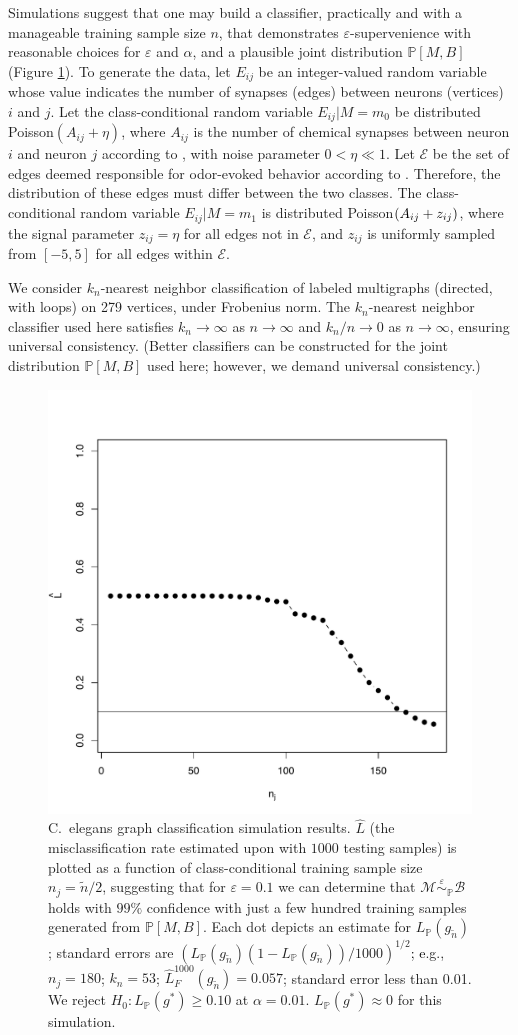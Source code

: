 \documentclass{article}
\newcommand{\mB}{\mathcal{B}}
\newcommand{\mM}{\mathcal{M}}
\newcommand{\PP}{\mathbb{P}}           %
\providecommand{\mc}[1]{\mathcal{#1}}
\providecommand{\mt}[1]{\widetilde{#1}}
\newcommand{\hL}{\widehat{L}}
\newcommand{\MeB}{\mM \overset{\varepsilon}{{\sim}}_{\PP} \mB}
\providecommand{\tr}[1]{\textcolor{black}{#1}}
\begin{document}
Simulations suggest that one may build a classifier, practically and with a manageable training sample size $n$, that demonstrates $\varepsilon$-supervenience with reasonable choices for $\varepsilon$ and $\alpha$, and a plausible joint distribution $\PP[M,B]$ (Figure \ref{fig1}). To generate the data, let $E_{ij}$ be an integer-valued random variable whose value indicates the number of synapses (edges) between neurons (vertices) $i$ and $j$.  Let the class-conditional random variable $E_{ij} | M=m_0$  be distributed Poisson$(A_{ij}+\eta)$, where $A_{ij}$ is the number of chemical synapses between neuron $i$ and neuron $j$ according to \cite{VarshneyChklovskii09}, with noise parameter $0<\eta \ll 1$.  Let $\mc{E}$ be the set of edges deemed responsible for odor-evoked behavior according to \cite{ChalasaniBargmann07}.  Therefore, the distribution of these edges must differ between the two classes.  The class-conditional random variable $E_{ij} | M=m_1$ is distributed Poisson$(A_{ij}+ \tr{z_{ij}})$, where the signal parameter $z_{ij}=\eta$ for all edges not in $\mc{E}$, and $z_{ij}$ is uniformly sampled from $[-5,5]$ for all edges within $\mc{E}$.

We consider $k_n$-nearest neighbor classification of labeled multigraphs (directed, with loops) on 279 vertices, under Frobenius norm. The $k_n$-nearest neighbor classifier used here satisfies $k_n \rightarrow \infty$ as $n \rightarrow \infty$ and $k_n/n \rightarrow 0$ as $n \rightarrow \infty$, ensuring universal consistency. (Better classifiers can be constructed for the joint distribution $\PP[M,B]$ used here; however, we demand universal consistency.)

\begin{figure}[!ht]
\centering \includegraphics[width=.5\linewidth]{Lhatplot}
\caption{C.~elegans graph classification simulation results.  $\hL$  (the misclassification rate estimated upon with $1000$ testing samples) %
is plotted as a function of class-conditional training sample size $n_j=\mt{n}/2$, suggesting that for $\varepsilon=0.1$ we can determine that $\MeB$ holds with $99\%$ confidence with just a few hundred training samples generated from $\PP[M,B]$. Each dot depicts an estimate for $L_{\PP}(g_{\mt{n}})$; standard errors are $(L_{\PP}(g_{\mt{n}})(1-L_{\PP}(g_{\mt{n}}))/1000)^{1/2}$\tr{; e}.g., $n_j = 180$; $k_n = 53$; $\hL^{1000}_{F}(g_{\mt{n}}) = 0.057$; standard error less than 0.01. We reject $H_0: L_{\PP}(g^*) \geq 0.10$ at $\alpha=0.01$. $L_{\PP}(g^*) \approx 0$ for this simulation.
}
\label{fig1}
\end{figure}
\end{document}
